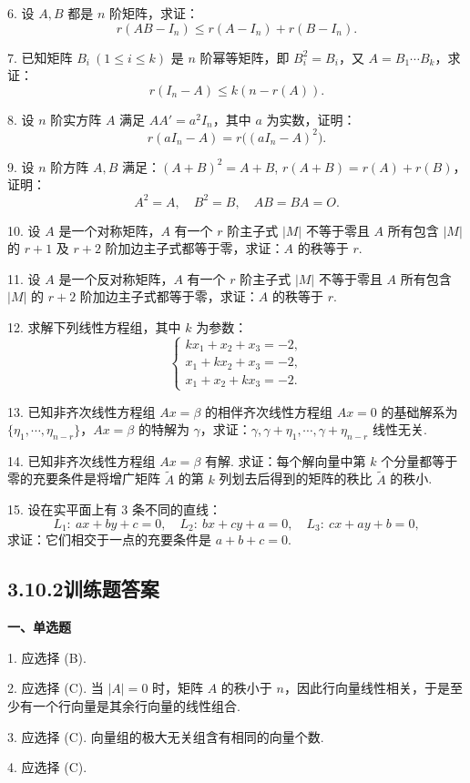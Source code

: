 \documentclass[UTF8, 12pt, fontset=fandol, oneside]{ctexart}
\begin{document}
6. 设 $A,B$ 都是 $n$ 阶矩阵，求证：
\[
r(AB-I_n)\le r(A-I_n)+r(B-I_n).
\]

7. 已知矩阵 $B_i\ (1\le i\le k)$ 是 $n$ 阶幂等矩阵，即 $B_i^2=B_i$，又 $A=B_1\cdots B_k$，求证：
\[
r(I_n-A)\le k(n-r(A)).
\]

8. 设 $n$ 阶实方阵 $A$ 满足 $AA'=a^2I_n$，其中 $a$ 为实数，证明：
\[
r(aI_n-A)=r\bigl((aI_n-A)^2\bigr).
\]

9. 设 $n$ 阶方阵 $A,B$ 满足：$(A+B)^2=A+B$, $r(A+B)=r(A)+r(B)$，证明：
\[
A^2=A,\quad B^2=B,\quad AB=BA=O.
\]

10. 设 $A$ 是一个对称矩阵，$A$ 有一个 $r$ 阶主子式 $|M|$ 不等于零且 $A$ 所有包含 $|M|$ 的 $r+1$ 及 $r+2$ 阶加边主子式都等于零，求证：$A$ 的秩等于 $r$.

11. 设 $A$ 是一个反对称矩阵，$A$ 有一个 $r$ 阶主子式 $|M|$ 不等于零且 $A$ 所有包含 $|M|$ 的 $r+2$ 阶加边主子式都等于零，求证：$A$ 的秩等于 $r$.

12. 求解下列线性方程组，其中 $k$ 为参数：
\[
\begin{cases}
kx_1+x_2+x_3=-2,\\
x_1+kx_2+x_3=-2,\\
x_1+x_2+kx_3=-2.
\end{cases}
\]

13. 已知非齐次线性方程组 $Ax=\beta$ 的相伴齐次线性方程组 $Ax=0$ 的基础解系为 $\{\eta_1,\cdots,\eta_{n-r}\}$，$Ax=\beta$ 的特解为 $\gamma$，求证：$\gamma,\gamma+\eta_1,\cdots,\gamma+\eta_{n-r}$ 线性无关.

14. 已知非齐次线性方程组 $Ax=\beta$ 有解. 求证：每个解向量中第 $k$ 个分量都等于零的充要条件是将增广矩阵 $\widetilde{A}$ 的第 $k$ 列划去后得到的矩阵的秩比 $\widetilde{A}$ 的秩小.

15. 设在实平面上有 3 条不同的直线：
\[
L_1:\ ax+by+c=0,\quad
L_2:\ bx+cy+a=0,\quad
L_3:\ cx+ay+b=0,
\]
求证：它们相交于一点的充要条件是 $a+b+c=0$.

\subsection*{3.10.2\quad 训练题答案}

\noindent\textbf{一、单选题}

1. 应选择 (B).

2. 应选择 (C). 当 $|A|=0$ 时，矩阵 $A$ 的秩小于 $n$，因此行向量线性相关，于是至少有一个行向量是其余行向量的线性组合.

3. 应选择 (C). 向量组的极大无关组含有相同的向量个数.

4. 应选择 (C).
\end{document}

